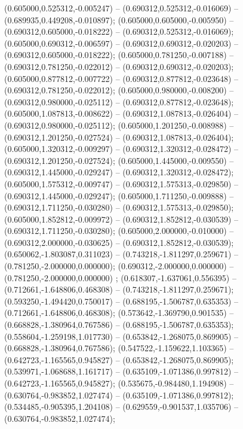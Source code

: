  (0.605000,0.525312,-0.005247) -- (0.690312,0.525312,-0.016069) -- (0.689935,0.449208,-0.010897);
 (0.605000,0.605000,-0.005950) -- (0.690312,0.605000,-0.018222) -- (0.690312,0.525312,-0.016069);
 (0.605000,0.690312,-0.006597) -- (0.690312,0.690312,-0.020203) -- (0.690312,0.605000,-0.018222);
 (0.605000,0.781250,-0.007188) -- (0.690312,0.781250,-0.022012) -- (0.690312,0.690312,-0.020203);
 (0.605000,0.877812,-0.007722) -- (0.690312,0.877812,-0.023648) -- (0.690312,0.781250,-0.022012);
 (0.605000,0.980000,-0.008200) -- (0.690312,0.980000,-0.025112) -- (0.690312,0.877812,-0.023648);
 (0.605000,1.087813,-0.008622) -- (0.690312,1.087813,-0.026404) -- (0.690312,0.980000,-0.025112);
 (0.605000,1.201250,-0.008988) -- (0.690312,1.201250,-0.027524) -- (0.690312,1.087813,-0.026404);
 (0.605000,1.320312,-0.009297) -- (0.690312,1.320312,-0.028472) -- (0.690312,1.201250,-0.027524);
 (0.605000,1.445000,-0.009550) -- (0.690312,1.445000,-0.029247) -- (0.690312,1.320312,-0.028472);
 (0.605000,1.575312,-0.009747) -- (0.690312,1.575313,-0.029850) -- (0.690312,1.445000,-0.029247);
 (0.605000,1.711250,-0.009888) -- (0.690312,1.711250,-0.030280) -- (0.690312,1.575313,-0.029850);
 (0.605000,1.852812,-0.009972) -- (0.690312,1.852812,-0.030539) -- (0.690312,1.711250,-0.030280);
 (0.605000,2.000000,-0.010000) -- (0.690312,2.000000,-0.030625) -- (0.690312,1.852812,-0.030539);
 (0.650062,-1.803087,0.311023) -- (0.743218,-1.811297,0.259671) -- (0.781250,-2.000000,0.000000);
 (0.690312,-2.000000,0.000000) -- (0.781250,-2.000000,0.000000) ;
 (0.618307,-1.637061,0.556395) -- (0.712661,-1.648806,0.468308) -- (0.743218,-1.811297,0.259671);
 (0.593250,-1.494420,0.750017) -- (0.688195,-1.506787,0.635353) -- (0.712661,-1.648806,0.468308);
 (0.573642,-1.369790,0.901535) -- (0.668828,-1.380964,0.767586) -- (0.688195,-1.506787,0.635353);
 (0.558604,-1.259198,1.017730) -- (0.653842,-1.268075,0.869905) -- (0.668828,-1.380964,0.767586);
 (0.547522,-1.159622,1.103365) -- (0.642723,-1.165565,0.945827) -- (0.653842,-1.268075,0.869905);
 (0.539971,-1.068688,1.161717) -- (0.635109,-1.071386,0.997812) -- (0.642723,-1.165565,0.945827);
 (0.535675,-0.984480,1.194908) -- (0.630764,-0.983852,1.027474) -- (0.635109,-1.071386,0.997812);
 (0.534485,-0.905395,1.204108) -- (0.629559,-0.901537,1.035706) -- (0.630764,-0.983852,1.027474);
